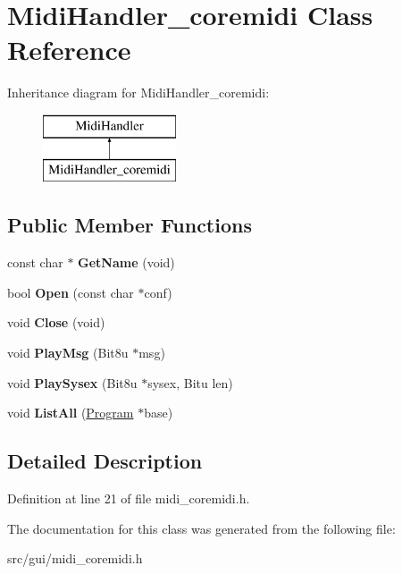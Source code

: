 \hypertarget{classMidiHandler__coremidi}{\section{Midi\-Handler\-\_\-coremidi Class Reference}
\label{classMidiHandler__coremidi}
}
Inheritance diagram for Midi\-Handler\-\_\-coremidi\-:\begin{figure}[H]
\begin{center}
\leavevmode
\includegraphics[height=2.000000cm]{classMidiHandler__coremidi}
\end{center}
\end{figure}
\subsection*{Public Member Functions}
\begin{DoxyCompactItemize}
\item 
\hypertarget{classMidiHandler__coremidi_a12a752957ce570d615f9df36004a62d4}{const char $\ast$ {\bfseries Get\-Name} (void)}\label{classMidiHandler__coremidi_a12a752957ce570d615f9df36004a62d4}

\item 
\hypertarget{classMidiHandler__coremidi_a5be85c4448a39ac81517aa9d2f5bc40a}{bool {\bfseries Open} (const char $\ast$conf)}\label{classMidiHandler__coremidi_a5be85c4448a39ac81517aa9d2f5bc40a}

\item 
\hypertarget{classMidiHandler__coremidi_a2b77595d41ee029730f899ef600cc954}{void {\bfseries Close} (void)}\label{classMidiHandler__coremidi_a2b77595d41ee029730f899ef600cc954}

\item 
\hypertarget{classMidiHandler__coremidi_aa8800f78e52ead18fbff1809cccaafa2}{void {\bfseries Play\-Msg} (Bit8u $\ast$msg)}\label{classMidiHandler__coremidi_aa8800f78e52ead18fbff1809cccaafa2}

\item 
\hypertarget{classMidiHandler__coremidi_a3da6325a06d609d99a5eb1586ecf4318}{void {\bfseries Play\-Sysex} (Bit8u $\ast$sysex, Bitu len)}\label{classMidiHandler__coremidi_a3da6325a06d609d99a5eb1586ecf4318}

\item 
\hypertarget{classMidiHandler__coremidi_a6a476a210417a959dce4429ad8a629cf}{void {\bfseries List\-All} (\hyperlink{classProgram}{Program} $\ast$base)}\label{classMidiHandler__coremidi_a6a476a210417a959dce4429ad8a629cf}

\end{DoxyCompactItemize}


\subsection{Detailed Description}


Definition at line 21 of file midi\-\_\-coremidi.\-h.



The documentation for this class was generated from the following file\-:\begin{DoxyCompactItemize}
\item 
src/gui/midi\-\_\-coremidi.\-h\end{DoxyCompactItemize}
